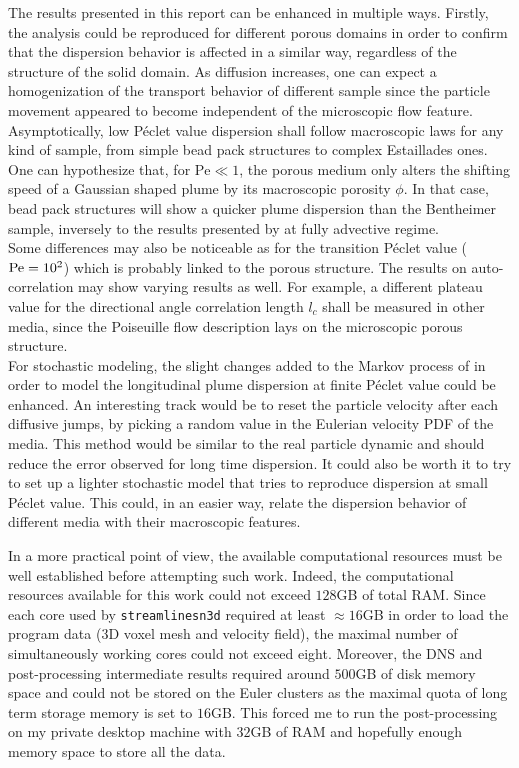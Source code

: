 The results presented in this report can be enhanced in multiple ways.
Firstly, the analysis could be reproduced for different porous domains in order to confirm that the dispersion behavior is affected in a similar way, regardless of the structure of the solid domain.
As diffusion increases, one can expect a homogenization of the transport behavior of different sample since the particle movement appeared to become independent of the microscopic flow feature.
Asymptotically, low Péclet value dispersion shall follow macroscopic laws for any kind of sample, from simple bead pack structures to complex Estaillades ones.
One can hypothesize that, for $\mathrm{Pe}\ll 1$, the porous medium only alters the shifting speed of a Gaussian shaped plume by its macroscopic porosity $\phi$. 
In that case, bead pack structures will show a quicker plume dispersion than the Bentheimer sample, inversely to the results presented by \cite{Meyer2016} at fully advective regime.\\
Some differences may also be noticeable as for the transition Péclet value ($\mathrm{Pe}=10^2$) which is probably linked to the porous structure. 
The results on auto-correlation may show varying results as well. 
For example, a different plateau value for the directional angle correlation length $l_c$ shall be measured in other media, since the Poiseuille flow description lays on the microscopic porous structure.\\
For stochastic modeling, the slight changes added to the Markov process of \citet{Meyer2016} in order to model the longitudinal plume dispersion at finite Péclet value could be enhanced.
An interesting track would be to reset the particle velocity after each diffusive jumps, by picking a random value in the Eulerian velocity PDF of the media. 
This method would be similar to the real particle dynamic and should reduce the error observed for long time dispersion.
It could also be worth it to try to set up a lighter stochastic model that tries to reproduce dispersion at small Péclet value. This could, in an easier way, relate the dispersion behavior of different media with their macroscopic features.

In a more practical point of view, the available computational resources must be well established before attempting such work.
Indeed, the computational resources available for this work could not exceed $128$GB of total RAM. 
Since each core used by \texttt{streamlinesn3d} required at least $\approx 16$GB in order to load the program data (3D voxel mesh and velocity field), the maximal number of simultaneously working cores could not exceed eight.
Moreover, the DNS and post-processing intermediate results required around $500$GB of disk memory space and could not be stored on the Euler clusters as the maximal quota of long term storage memory is set to $16$GB. 
This forced me to run the post-processing on my private desktop machine with $32$GB of RAM and hopefully enough memory space to store all the data.

